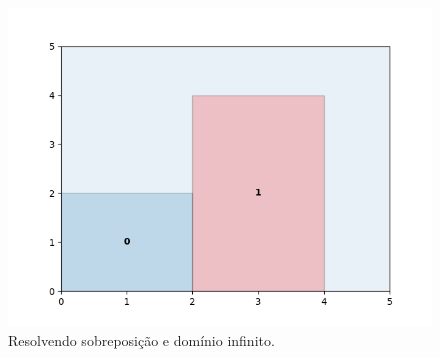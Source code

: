 \begin{figure}[H]
    \centering
    \includegraphics[scale=0.5]{utils/images/continuous_example}
    \caption{Resolvendo sobreposição e domínio infinito.}
    \label{fig:sobreposicao-dominio}
\end{figure}

